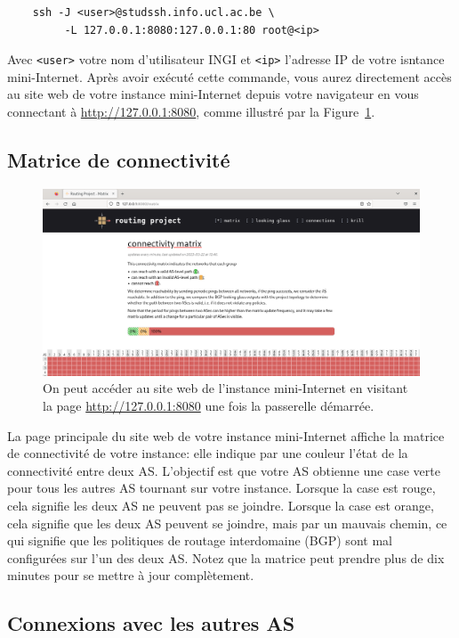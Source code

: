 \documentclass[a4paper, 11pt]{article}
\begin{document}
\begin{verbatim}
    ssh -J <user>@studssh.info.ucl.ac.be \
         -L 127.0.0.1:8080:127.0.0.1:80 root@<ip>
\end{verbatim}
Avec \texttt{<user>} votre nom d'utilisateur INGI et \texttt{<ip>} l'adresse IP
de votre isntance mini-Internet.
Après avoir exécuté cette commande, vous aurez directement accès au site web
de votre instance mini-Internet depuis votre navigateur en vous connectant
à \url{http://127.0.0.1:8080}, comme illustré par la
Figure~\ref{fig:website-screenshot}.

\subsection{Matrice de connectivité}

\begin{figure}
    \centering
    \includegraphics[width=0.8\linewidth]{figures/website-screenshot.png}
    \caption{On peut accéder au site web de l'instance mini-Internet
            en visitant la page \url{http://127.0.0.1:8080}
            une fois la passerelle démarrée.}
    \label{fig:website-screenshot}
\end{figure}

La page principale du site web de votre instance mini-Internet affiche la
matrice de connectivité de votre instance: elle indique par une couleur
l'état de la connectivité entre deux AS. L'objectif est que votre AS
obtienne une case verte pour tous les autres AS tournant sur votre instance.
Lorsque la case est rouge, cela signifie les deux AS ne peuvent pas se joindre.
Lorsque la case est orange, cela signifie que les deux AS peuvent se joindre,
mais par un mauvais chemin, ce qui signifie que les politiques de routage
interdomaine (BGP) sont mal configurées sur l'un des deux AS. Notez que la
matrice peut prendre plus de dix minutes pour se mettre à jour complètement.


\subsection{Connexions avec les autres AS}
\end{document}
